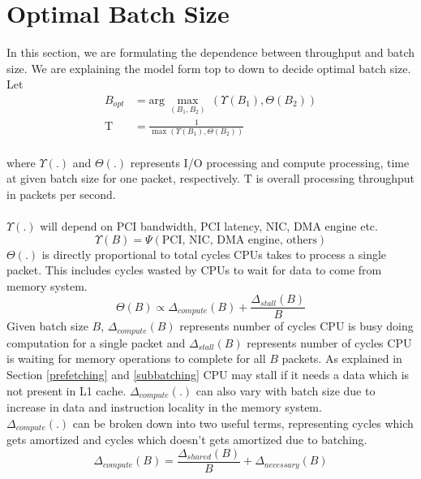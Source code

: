\section{Optimal Batch Size}
\label{optimalbatchsize}
In this section, we are formulating the dependence between throughput and batch size. We are explaining the model form top to down to decide optimal batch size. Let
\begin{align}
B_{opt} &=  \text{arg}\,\max\limits_{(B_1, B_2)}\, (\Upsilon(B_1) , \Theta(B_2)) \label{bopt}
\\
\text{T} &= \frac{1}{\max (\Upsilon(B_1) , \Theta(B_2))} \label{overall_throughput}
\end{align}
\\
where $\Upsilon(.)$ and $\Theta(.)$ represents I/O processing and compute processing, time at given batch size for one packet, respectively. $\text{T}$ is overall processing throughput in packets per second.\\ \\
$\Upsilon(.)$ will depend on PCI bandwidth, PCI latency, NIC, DMA engine etc.
\begin{equation} 
\label{nic_throughput}
\Upsilon(B) = \Psi(\textrm{PCI, NIC, DMA engine, others})
\end{equation}
$\Theta(.)$ is directly proportional to total cycles CPUs takes to process a single packet. This includes cycles wasted by CPUs to wait for data to come from memory system. 
\\
\begin{equation} 
\label{compute_througput}
\Theta(B) \propto \Delta_{compute}(B) + \frac{\Delta_{stall}(B)}{B}
\end{equation}
Given batch size $B$, $\Delta_{compute}(B)$ represents number of cycles CPU is busy doing computation for a single packet and $\Delta_{stall}(B)$ represents number of cycles CPU  is waiting for memory operations to complete for all $B$ packets. As explained in Section \ref{prefetching}  and \ref{subbatching} CPU may stall if it needs a data which is not present in L1 cache. $\Delta_{compute}(.)$ can also vary with batch size due to increase in data and instruction locality in the memory system.
\\
$\Delta_{compute}(.)$ can be broken down into two useful terms, representing cycles which gets amortized and cycles which doesn't gets amortized due to batching.
\\
\begin{equation} 
\label{cycles_compute}
\Delta_{compute}(B) = \frac{\Delta_{shared}(B)}{B} + \Delta_{necessary}(B)
\end{equation}
